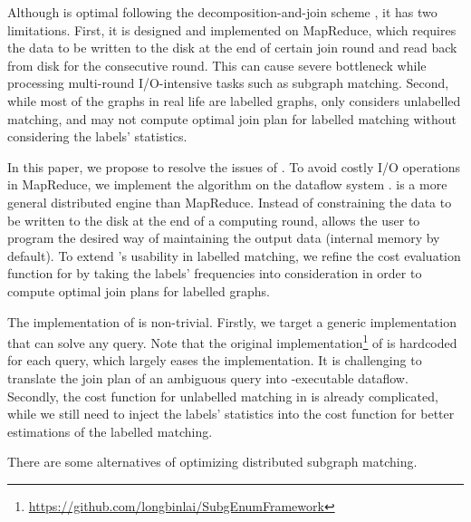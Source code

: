  Although \cliquejoin is optimal following the decomposition-and-join scheme \cite{Lai2016}, it has two limitations. First, it is designed and implemented on MapReduce, which requires the data to be written to the disk at the end of certain join round and read back from disk for the consecutive round. This can cause severe bottleneck while processing multi-round I/O-intensive tasks such as subgraph matching. Second, while most of the graphs in real life are labelled graphs, \cliquejoin only considers unlabelled matching, and may not compute optimal join plan for labelled matching without considering the labels' statistics.

In this paper, we propose \gencliqjoin to resolve the issues of \cliquejoin. To avoid costly I/O operations in MapReduce, we implement the algorithm on the \timely dataflow system \cite{Murray2013}. \timely is a more general distributed engine than MapReduce. Instead of constraining the data to be written to the disk at the end of a computing round, \timely allows the user to program the desired way of maintaining the output data (internal memory by default). To extend \cliquejoin's usability in labelled matching, we refine the cost evaluation function for \cliquejoin by taking the labels' frequencies into consideration in order to compute optimal join plans for labelled graphs.

The implementation of \gencliqjoin is non-trivial. Firstly, we target a generic implementation that can solve any query. Note that the original implementation\footnote{\url{https://github.com/longbinlai/SubgEnumFramework}} of \cliquejoin is hardcoded for each query, which largely eases the implementation. It is challenging to translate the join plan of an ambiguous query into \timely-executable dataflow. Secondly, the cost function for unlabelled matching in \cliquejoin is already complicated, while we still need to inject the labels' statistics into the cost function for better estimations of the labelled matching.

There are some alternatives of optimizing distributed subgraph matching.


